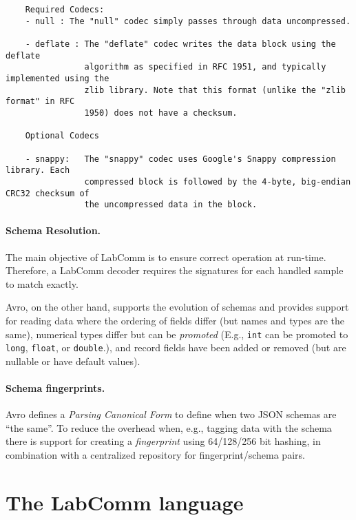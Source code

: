 \documentclass[a4paper]{article}
\begin{document}
    \begin{verbatim}
    Required Codecs:
    - null : The "null" codec simply passes through data uncompressed.

    - deflate : The "deflate" codec writes the data block using the deflate
                algorithm as specified in RFC 1951, and typically implemented using the
                zlib library. Note that this format (unlike the "zlib format" in RFC
                1950) does not have a checksum.

    Optional Codecs

    - snappy:   The "snappy" codec uses Google's Snappy compression library. Each
                compressed block is followed by the 4-byte, big-endian CRC32 checksum of
                the uncompressed data in the block.

    \end{verbatim}

  \paragraph{Schema Resolution.} The main objective of LabComm is to
    ensure correct operation at run-time. Therefore, a LabComm decoder
    requires the signatures for each handled sample to match exactly.

    Avro, on the other hand, supports the evolution of schemas and
    provides support for reading data where the ordering of fields
    differ (but names and types are the same), numerical types differ
    but can be
    \emph{promoted} (E.g., \verb+int+ can be promoted to \verb+long+,
    \verb+float+, or \verb+double+.), and record fields have been added
    or removed (but are nullable or have default values).

    \paragraph{Schema fingerprints.} Avro defines a \emph{Parsing
    Canonical Form} to define when two JSON schemas are ``the same''.
    To reduce the overhead when, e.g., tagging data with the schema
    there is support for creating a \emph{fingerprint} using 64/128/256
    bit hashing, in combination with a centralized repository for
    fingerprint/schema pairs.

{}


\appendix
\newpage

\section{The LabComm language}
\label{sec:LanguageGrammar}
\end{document}
